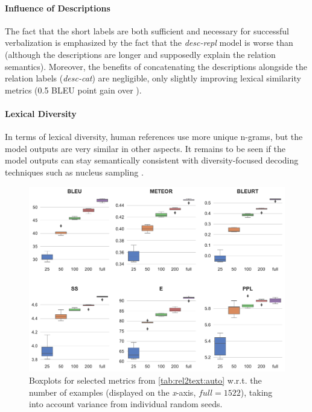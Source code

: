 \paragraph{Influence of Descriptions} The fact that the short labels are both sufficient and necessary for successful verbalization is emphasized by the fact that the \textit{desc-repl} model is worse than \BARTr{} (although the descriptions are longer and supposedly explain the relation semantics). Moreover, the benefits of concatenating the descriptions alongside the relation labels (\textit{desc-cat}) are negligible, only slightly improving lexical similarity metrics (0.5 BLEU point gain over \BARTr{}).

\paragraph{Lexical Diversity} In terms of lexical diversity, human references use more unique n-grams, but the model outputs are very similar in other aspects. It remains to be seen if the model outputs can stay semantically consistent with diversity-focused decoding techniques such as nucleus sampling \cite{holtzman2019curious}.

\begin{figure}[t]
    \centering
    \includegraphics[width=\textwidth]{img/rel2text-fewshot.pdf}
    \caption{Boxplots for selected metrics from \autoref{tab:rel2text:auto} w.r.t. the number of examples (displayed on the \textit{x}-axis, $\textit{full} = 1522$), taking into account variance from individual random seeds.}\label{fig:rel2text:fewshot}
\end{figure}

